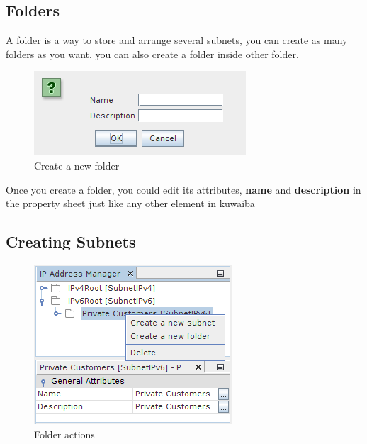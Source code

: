 \documentclass[a4paper]{article}
\begin{document}
		\subsection{Folders}
		A folder is a way to store and arrange several subnets, you can create as many folders as you want, you can also create a folder inside other folder.
		\begin{figure}[h!]
			\centering
			\includegraphics[width=0.4\linewidth]{img/ipam_create_new_folder.png}
			\caption{Create a new folder}
			\label{fig:ipam_create_new_folder}
		\end{figure}
		
		Once you create a folder, you could edit its attributes, \textbf{name} and \textbf{description} in the property sheet just like any other element in kuwaiba

		\subsection{Creating Subnets}
		\begin{figure}[h!]
			\centering
			\includegraphics[width=0.4\linewidth]{img/ipam_folder_actions.png}
			\caption{Folder actions}
			\label{fig:ipam_folder_actions}
		\end{figure}
	
\end{document}
